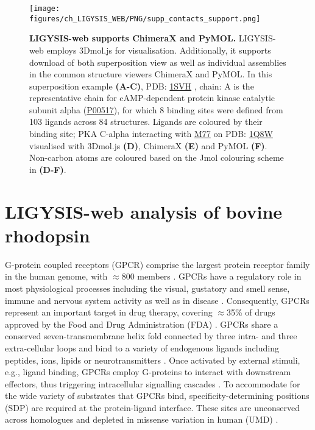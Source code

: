 \begin{figure}[htb!]
    \centering
    \texttt{[image: figures/ch\_LIGYSIS\_WEB/PNG/supp\_contacts\_support.png]}
    \caption[LIGYSIS-web supports ChimeraX and PyMOL]{\textbf{LIGYSIS-web supports ChimeraX and PyMOL.} LIGYSIS-web employs 3Dmol.js for visualisation. Additionally, it supports download of both superposition view as well as individual assemblies in the common structure viewers ChimeraX and PyMOL. In this superposition example \textbf{(A-C)}, PDB: \href{https://www.ebi.ac.uk/pdbe/entry/pdb/1svh}{1SVH} \cite{BREITENLECHNER_2004_PKB}, chain: A is the representative chain for cAMP-dependent protein kinase catalytic subunit alpha (\href{https://www.uniprot.org/uniprotkb/P00517/entry}{P00517}), for which 8 binding sites were defined from 103 ligands across 84 structures. Ligands are coloured by their binding site; PKA C-alpha interacting with \href{https://www.ebi.ac.uk/pdbe-srv/pdbechem/chemicalCompound/show/M77}{M77} on PDB: \href{https://www.ebi.ac.uk/pdbe/entry/pdb/1q8w}{1Q8W} \cite{BREITENLECHNER_2003_PKA} visualised with 3Dmol.js \textbf{(D)}, ChimeraX \textbf{(E)} and PyMOL \textbf{(F)}. Non-carbon atoms are coloured based on the Jmol colouring scheme \cite{JMOL} in \textbf{(D-F)}.}
    \label{fig:supp_suport}
\end{figure}

\section{LIGYSIS-web analysis of bovine rhodopsin}

G-protein coupled receptors (GPCR) comprise the largest protein receptor family in the human genome, with $\approx$800 members \cite{LIU_2024_GPCRs}. GPCRs have a regulatory role in most physiological processes including the visual, gustatory and smell sense, immune and nervous system activity as well as in disease \cite{LATORRACA_2017_GPCRs}. Consequently, GPCRs represent  an important target in drug therapy, covering $\approx$35\% of drugs approved by the Food and Drug Administration (FDA) \cite{HAUSER_2017_GPCRS, INSEL_2019_GPCRs}. GPCRs share a conserved seven-transmembrane helix fold connected by three intra- and three extra-cellular loops \cite{ZHANG_2024_GPCRs} and bind to a variety of endogenous ligands including peptides, ions, lipids or neurotransmitters \cite{ZARZYCKA_2019_GPCRs, MANNES_2022_GPCRs}. Once activated by external stimuli, e.g., ligand binding, GPCRs employ G-proteins to interact with downstream effectors, thus triggering intracellular signalling cascades \cite{CHENG_2023_GPCRs}. To accommodate for the wide variety of substrates that GPCRs bind, specificity-determining positions (SDP) are required at the protein-ligand interface. These sites are unconserved across homologues and depleted in missense variation in human (UMD) \cite{MACGOWAN_2024_VARIANTS}.

